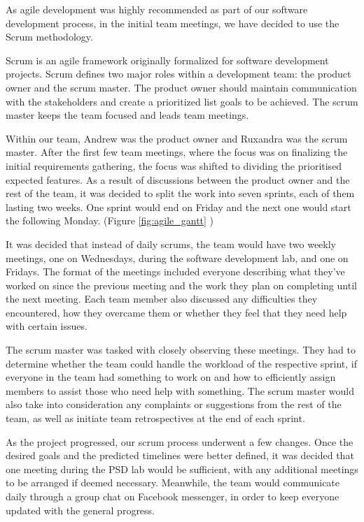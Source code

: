 \documentclass{l3proj}
\begin{document}
As agile development was highly recommended as part of our software development
 process, in the initial team meetings, we have decided to use the Scrum
 methodology.

 Scrum is an agile framework originally formalized for software development
 projects. Scrum defines two major roles within a development team: the product
 owner and the scrum master. The product owner should maintain communication
 with the stakeholders and create a prioritized list goals to be achieved.
 The scrum master keeps the team focused and leads team meetings.\cite{scrum_overview}

 Within our team, Andrew was the product owner and Ruxandra was the scrum master.
  After the first few team meetings, where the focus was on finalizing the initial
  requirements gathering, the focus was shifted to dividing the prioritised
  expected features. As a result of discussions between the product owner and
  the rest of the team, it was decided to split the work into seven sprints,
  each of them lasting two weeks. One sprint would end on Friday and the next
  one would start the following Monday. (Figure \ref{fig:agile_gantt} )


 It was decided that instead of daily scrums, the team would have two weekly
  meetings, one on Wednesdays, during the software development lab, and one on
  Fridays. The format of the meetings included everyone describing what they've
  worked on since the previous meeting and the work they plan on completing
  until the next meeting. Each team member also discussed any difficulties
  they encountered, how they overcame them or whether they feel that they
  need help with certain issues.

 The scrum master was tasked with closely observing these meetings. They had
  to determine whether the team could handle the workload of the respective
  sprint, if everyone in the team had something to work on and how to efficiently
  assign members to assist those who need help with something. The scrum
  master would also take into consideration any complaints or suggestions from
  the rest of the team, as well as initiate team retrospectives at the end of
  each sprint.

 As the project progressed, our scrum process underwent a few changes. Once
 the desired goals and the predicted timelines were better defined, it was
 decided that one meeting during the PSD lab would be sufficient, with any
 additional meetings to be arranged if deemed necessary. Meanwhile, the team
 would communicate daily through a group chat on Facebook messenger, in order
 to keep everyone updated with the general progress.
\end{document}
